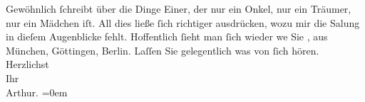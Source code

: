 \begin{ledgroupsized}[t]{13cm}
               Gewöhnlich ſchreibt über die Dinge Einer, der nur ein Onkel, {\pb}nur ein Träumer, nur ein Mädchen iſt. All dies ließe ſich
               richtiger ausdrücken, wozu mir die Sa{\geminationm}lung in dieſem
               Augenblicke fehlt.\pend
           \pstart
           Hoffentlich ſieht man ſich wieder we{\geminationn} Sie \label{K_L01638_2v}\label{K_L01638_2h}, aus München, Göttingen, Berlin. Laſſen Sie gelegentlich
               was von ſich hören.\pend
           \pstart
           Herzlichst{\\[\baselineskip]}Ihr{\\[\baselineskip]}\spacefill\mbox{Arthur.}\pend
           \leftskip=0em{}
         
         \endnumbering{}\end{ledgroupsized}  \newcommand{\dateiname}{L01638}\newcommand{\titel}{Arthur Schnitzler an Hugo von Hofmannsthal, 27. 11. 1906}\newcommand{\editorInnen}{Martin Anton Müller und Gerd-Hermann Susen}
      